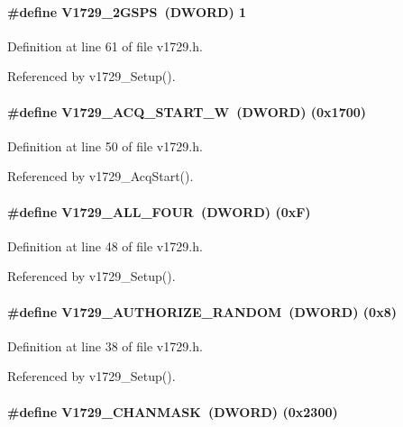 \paragraph[{V1729\_\-2GSPS}]{\setlength{\rightskip}{0pt plus 5cm}\#define V1729\_\-2GSPS~({\bf DWORD})  1}\hfill\label{v1729_8h_a14b24ed92ea827a959e2bb4386f29434}


Definition at line 61 of file v1729.h.

Referenced by v1729\_\-Setup().
\paragraph[{V1729\_\-ACQ\_\-START\_\-W}]{\setlength{\rightskip}{0pt plus 5cm}\#define V1729\_\-ACQ\_\-START\_\-W~({\bf DWORD}) (0x1700)}\hfill\label{v1729_8h_abf53a8e38697834822a95f6aba381608}


Definition at line 50 of file v1729.h.

Referenced by v1729\_\-AcqStart().
\paragraph[{V1729\_\-ALL\_\-FOUR}]{\setlength{\rightskip}{0pt plus 5cm}\#define V1729\_\-ALL\_\-FOUR~({\bf DWORD})   (0xF)}\hfill\label{v1729_8h_ad3a02cf8d0c42782b5278fc2c9f02385}


Definition at line 48 of file v1729.h.

Referenced by v1729\_\-Setup().
\paragraph[{V1729\_\-AUTHORIZE\_\-RANDOM}]{\setlength{\rightskip}{0pt plus 5cm}\#define V1729\_\-AUTHORIZE\_\-RANDOM~({\bf DWORD})   (0x8)}\hfill\label{v1729_8h_a2f8d74ce36daff6099fed3cc57f98e00}


Definition at line 38 of file v1729.h.

Referenced by v1729\_\-Setup().
\paragraph[{V1729\_\-CHANMASK}]{\setlength{\rightskip}{0pt plus 5cm}\#define V1729\_\-CHANMASK~({\bf DWORD}) (0x2300)}\hfill\label{v1729_8h_a535c4dbdfba99766b5ea1ee8b2e83bf9}


